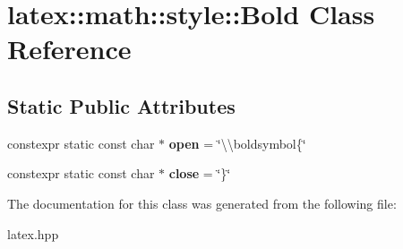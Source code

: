 \hypertarget{classlatex_1_1math_1_1style_1_1Bold}{\section{latex\-:\-:math\-:\-:style\-:\-:Bold Class Reference}
\label{classlatex_1_1math_1_1style_1_1Bold}
}
\subsection*{Static Public Attributes}
\begin{DoxyCompactItemize}
\item 
\hypertarget{classlatex_1_1math_1_1style_1_1Bold_a1950a427f6a370117c8dc675bd9541da}{constexpr static const char $\ast$ {\bfseries open} = \char`\"{}\textbackslash{}\textbackslash{}boldsymbol\{\char`\"{}}\label{classlatex_1_1math_1_1style_1_1Bold_a1950a427f6a370117c8dc675bd9541da}

\item 
\hypertarget{classlatex_1_1math_1_1style_1_1Bold_adeb97deb8b2dd178a6fcb40ef914e871}{constexpr static const char $\ast$ {\bfseries close} = \char`\"{}\}\char`\"{}}\label{classlatex_1_1math_1_1style_1_1Bold_adeb97deb8b2dd178a6fcb40ef914e871}

\end{DoxyCompactItemize}


The documentation for this class was generated from the following file\-:\begin{DoxyCompactItemize}
\item 
latex.\-hpp\end{DoxyCompactItemize}
